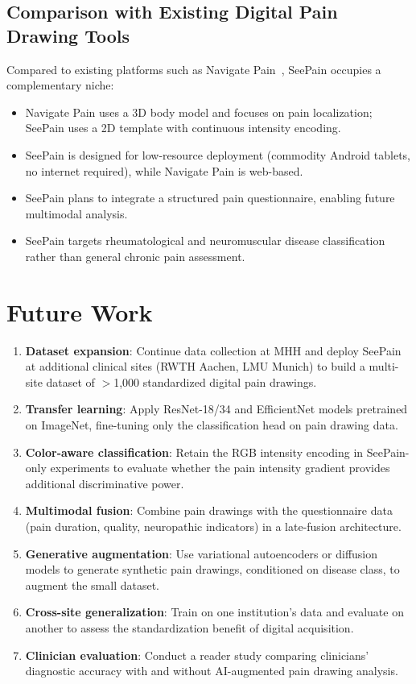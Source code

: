 \documentclass[conference]{IEEEtran}
\begin{document}
\subsection{Comparison with Existing Digital Pain Drawing Tools}

Compared to existing platforms such as Navigate Pain~\cite{boudreau2016}, SeePain occupies a complementary niche:
\begin{itemize}
    \item Navigate Pain uses a 3D body model and focuses on pain localization; SeePain uses a 2D template with continuous intensity encoding.
    \item SeePain is designed for low-resource deployment (commodity Android tablets, no internet required), while Navigate Pain is web-based.
    \item SeePain plans to integrate a structured pain questionnaire, enabling future multimodal analysis.
    \item SeePain targets rheumatological and neuromuscular disease classification rather than general chronic pain assessment.
\end{itemize}

\section{Future Work}
\label{sec:future_work}

\begin{enumerate}
    \item \textbf{Dataset expansion}: Continue data collection at MHH and deploy SeePain at additional clinical sites (RWTH Aachen, LMU Munich) to build a multi-site dataset of $>$1,000 standardized digital pain drawings.
    \item \textbf{Transfer learning}: Apply ResNet-18/34 and EfficientNet models pretrained on ImageNet, fine-tuning only the classification head on pain drawing data.
    \item \textbf{Color-aware classification}: Retain the RGB intensity encoding in SeePain-only experiments to evaluate whether the pain intensity gradient provides additional discriminative power.
    \item \textbf{Multimodal fusion}: Combine pain drawings with the questionnaire data (pain duration, quality, neuropathic indicators) in a late-fusion architecture.
    \item \textbf{Generative augmentation}: Use variational autoencoders or diffusion models to generate synthetic pain drawings, conditioned on disease class, to augment the small dataset.
    \item \textbf{Cross-site generalization}: Train on one institution's data and evaluate on another to assess the standardization benefit of digital acquisition.
    \item \textbf{Clinician evaluation}: Conduct a reader study comparing clinicians' diagnostic accuracy with and without AI-augmented pain drawing analysis.
\end{enumerate}
\end{document}
